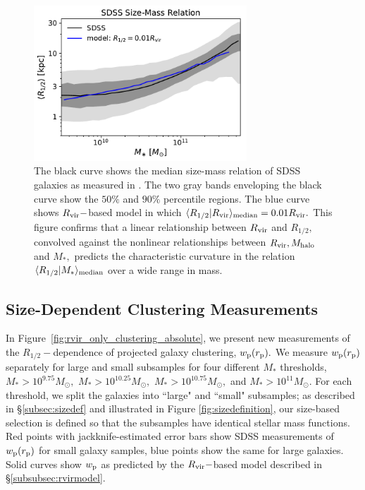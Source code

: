 \documentclass[usenatbib,usegraphicx,letterpaper]{mn2e}
\newcommand{\rhalf}{R_{1/2}}
\newcommand{\mstar}{M_{\ast}}
\newcommand{\mhalo}{M_{\rm halo}}
\newcommand{\rvir}{R_{\rm vir}}
\newcommand{\rproj}{r_{\rm p}}
\newcommand{\wproj}{w_{\rm p}}
\newcommand{\median}[2]{\langle{#1}\vert{#2}\rangle_{\rm median}}
\newcommand{\msun}{M_\odot}
\begin{document}
\begin{figure}
\centering
\includegraphics[width=8cm]{FIGS/rvir_only_rhalf_vs_mstar_sham_model.pdf}
\caption{
The black curve shows the median size-mass relation of SDSS galaxies as measured in \citet{meert_etal15}. The two gray bands enveloping the black curve show the $50\%$ and $90\%$ percentile regions. The blue curve shows $\rvir-$based model in which $\median{\rhalf}{\rvir}=0.01\rvir.$ This figure confirms that a linear relationship between $\rvir$ and $\rhalf,$ convolved against the nonlinear relationships between $\rvir, \mhalo$ and $\mstar,$  predicts the characteristic curvature in the relation $\median{\rhalf}{\mstar}$ over a wide range in mass.
}
\label{fig:scatter_plot}
\end{figure}

\subsection{Size-Dependent Clustering Measurements}
\label{subsec:clustering_results}

In Figure~\ref{fig:rvir_only_clustering_absolute}, we present new measurements of the $\rhalf-$dependence of projected galaxy clustering, $\wproj(\rproj).$ We measure $\wproj(\rproj)$ separately for large and small subsamples for four different $\mstar$ thresholds, $\mstar>10^{9.75}\msun,$ $\mstar>10^{10.25}\msun,$ $\mstar>10^{10.75}\msun,$ and $\mstar>10^{11}\msun.$ For each threshold, we split the galaxies into ``large" and ``small" subsamples; as described in \S\ref{subsec:sizedef} and illustrated in Figure \ref{fig:sizedefinition}, our size-based selection is defined so that the subsamples have identical stellar mass functions. Red points with jackknife-estimated error bars show SDSS measurements of $\wproj(\rproj)$ for small galaxy samples, blue points show the same for large galaxies. Solid curves show $\wproj$ as predicted by the $\rvir-$based model described in \S\ref{subsubsec:rvirmodel}.
\end{document}

